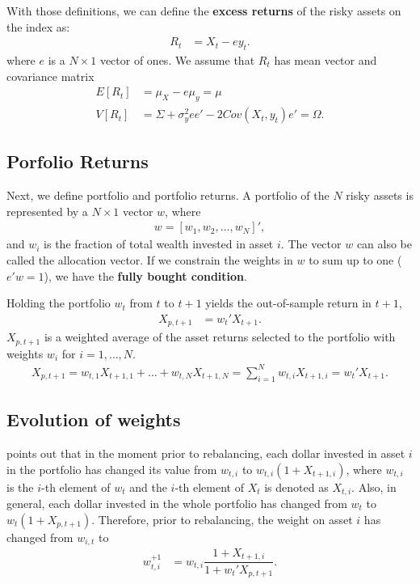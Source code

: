 \documentclass[preprint,authoryear,review,12pt]{elsarticle}
\begin{document}
With those definitions, we can define the \textbf{excess returns} of the risky assets on the index as:
\begin{align*}
	R_{t} &= X_{t} - e y_{t}.
\end{align*}
where $e$ is a $N \times 1$ vector of ones.
We assume that $R_{t}$ has mean vector and covariance matrix 
\begin{align*}
E[R_{t}] &= \mu_{X}-e\mu_{y}=\mu
\\
V[R_{t}] &= \Sigma + \sigma_{y}^{2}ee' - 2Cov(X_{t},y_{t})e' =\Omega.
\end{align*}


\subsection*{Porfolio Returns}

Next, we define portfolio and portfolio returns.
A portfolio of the $N$ risky assets is represented by a $N\times 1$ vector $w$, where
\begin{align*}
	w = \left[ w_1, w_2 , \dots, w_N \right]',
\end{align*}
and $w_{i}$ is the fraction of total wealth invested in asset $i$.
The vector $w$ can also be called the allocation vector.
If we constrain the weights in $w$ to sum up to one ($e'w=1$), we have the \textbf{fully bought condition}.

Holding the portfolio $w_{t}$ from $t$ to $t+1$ yields the out-of-sample return in $t+1$,
\begin{align} \label{eq:retport}
	X_{p,t+1} &= w_{t}'X_{t+1}.
\end{align}
$X_{p,t+1}$ is a weighted average of the asset returns selected to the portfolio with weights $w_{i}$ for $i=1,\dots,N$.
\begin{align*} \label{ret_port}
	X_{p,t+1} = w_{t,1} X_{t+1,1} + \dots + w_{t,N} X_{t+1,N}
	= \sum_{i=1}^{N} w_{t,i} X_{t+1,i} = w_{t}'X_{t+1}.
\end{align*}

\subsection*{Evolution of weights}

\cite{liu-2009} points out that in the moment prior to rebalancing, each dollar invested in asset $i$ in the portfolio has changed its value from $w_{t,i}$ to $w_{t,i}(1+X_{t+1,i})$, where $w_{t,i}$ is the $i$-th element of $w_{t}$ and the $i$-th element of $X_{t}$ is denoted as $X_{t,i}$.
Also, in general, each dollar invested in the whole portfolio has changed from $w_{t}$ to $w_{t}(1+X_{p,t+1})$.
Therefore, prior to rebalancing, the weight on asset $i$ has changed from $w_{i,t}$ to 
\begin{align*}
	w_{t,i}^{+1} &= w_{t,i} \dfrac{1+X_{t+1,i}}{1+w_{t}'X_{p,t+1}}.
\end{align*}
\end{document}
